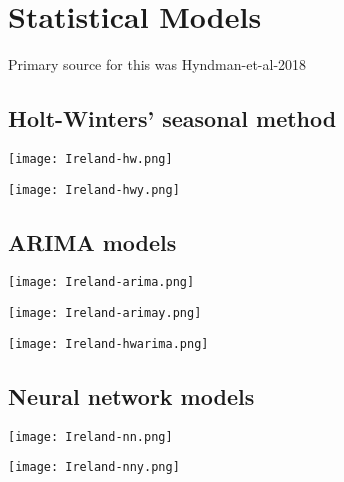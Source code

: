 \section{Statistical Models}
\label{ch:statmodel}

Primary source for this was Hyndman-et-al-2018 %

\subsection{Holt-Winters’ seasonal method}

\texttt{[image: Ireland-hw.png]}

\texttt{[image: Ireland-hwy.png]}


\subsection{ARIMA models}

\texttt{[image: Ireland-arima.png]}

\texttt{[image: Ireland-arimay.png]}

\texttt{[image: Ireland-hwarima.png]}


\subsection{Neural network models}

\texttt{[image: Ireland-nn.png]}

\texttt{[image: Ireland-nny.png]}